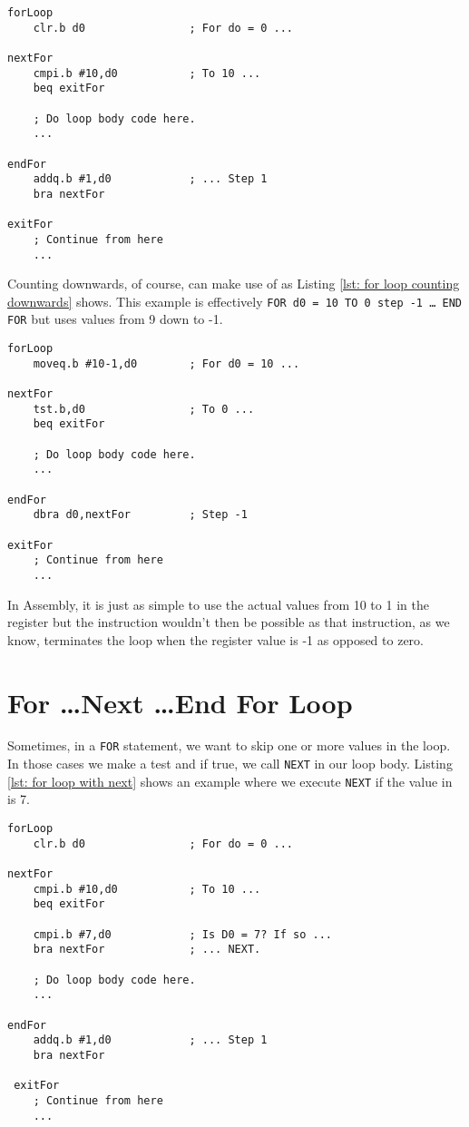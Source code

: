 \begin{lstlisting}[caption={FOR \ldots END FOR forwards STEP},label={lst: for loop counting upwards}]
forLoop
    clr.b d0                ; For do = 0 ...
    
nextFor
    cmpi.b #10,d0           ; To 10 ...
    beq exitFor
    
    ; Do loop body code here.
    ...

endFor
    addq.b #1,d0            ; ... Step 1
    bra nextFor

exitFor
    ; Continue from here
    ...
\end{lstlisting}

Counting downwards, of course, can make use of  as Listing \ref{lst: for loop counting downwards} shows. This example is effectively \texttt{FOR d0 = 10 TO 0 step -1 \ldots{} END FOR} but uses values from 9 down to -1.

\begin{lstlisting}[caption={FOR \ldots END FOR backwards STEP},label={lst: for loop counting downwards}]
forLoop
    moveq.b #10-1,d0        ; For d0 = 10 ...
    
nextFor
    tst.b,d0                ; To 0 ...
    beq exitFor
    
    ; Do loop body code here.
    ...
    
endFor
    dbra d0,nextFor         ; Step -1
    
exitFor
    ; Continue from here
    ...
\end{lstlisting}

In Assembly, it is just as simple to use the actual values from 10 to 1 in the register but the  instruction wouldn't then be possible as that instruction, as we know, terminates the loop when the register value is -1 as opposed to zero.

\section{For \ldots\protect Next \ldots\protect End For Loop}

Sometimes, in a \texttt{FOR} statement, we want to skip one or more values in the loop. In those cases we make a test and if true, we call \texttt{NEXT} in our loop body. Listing \ref{lst: for loop with next} shows an example where we execute \texttt{NEXT} if the value in  is 7.

\begin{lstlisting}[caption={FOR \ldots NEXT \ldots END FOR},label={lst: for loop with next}]
forLoop
    clr.b d0                ; For do = 0 ...
    
nextFor
    cmpi.b #10,d0           ; To 10 ...
    beq exitFor
    
    cmpi.b #7,d0            ; Is D0 = 7? If so ...
    bra nextFor             ; ... NEXT.
    
    ; Do loop body code here.
    ...
    
endFor
    addq.b #1,d0            ; ... Step 1
    bra nextFor
    
 exitFor
    ; Continue from here
    ...
\end{lstlisting}

